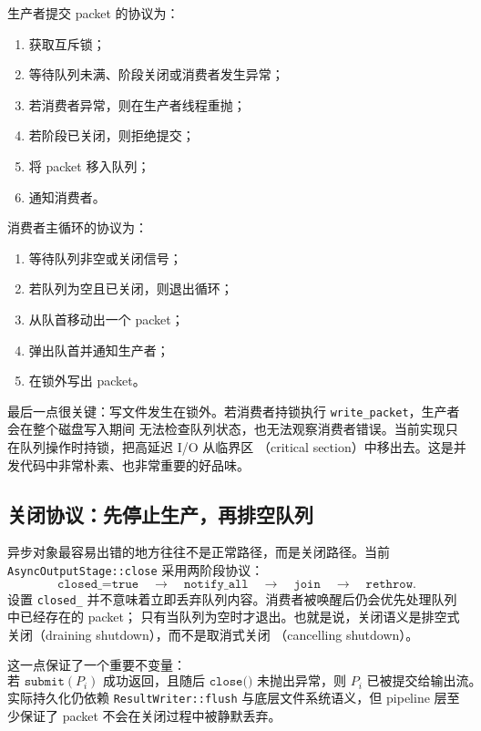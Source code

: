 生产者提交 packet 的协议为：

\begin{enumerate}
    \item 获取互斥锁；
    \item 等待队列未满、阶段关闭或消费者发生异常；
    \item 若消费者异常，则在生产者线程重抛；
    \item 若阶段已关闭，则拒绝提交；
    \item 将 packet 移入队列；
    \item 通知消费者。
\end{enumerate}

消费者主循环的协议为：

\begin{enumerate}
    \item 等待队列非空或关闭信号；
    \item 若队列为空且已关闭，则退出循环；
    \item 从队首移动出一个 packet；
    \item 弹出队首并通知生产者；
    \item 在锁外写出 packet。
\end{enumerate}

最后一点很关键：写文件发生在锁外。若消费者持锁执行 \texttt{write\_packet}，生产者会在整个磁盘写入期间
无法检查队列状态，也无法观察消费者错误。当前实现只在队列操作时持锁，把高延迟 I/O 从临界区
（critical section）中移出去。这是并发代码中非常朴素、也非常重要的好品味。

\subsection{关闭协议：先停止生产，再排空队列}

异步对象最容易出错的地方往往不是正常路径，而是关闭路径。当前 \texttt{AsyncOutputStage::close}
采用两阶段协议：
\[
    \texttt{closed\_=true}
    \quad\rightarrow\quad
    \texttt{notify\_all}
    \quad\rightarrow\quad
    \texttt{join}
    \quad\rightarrow\quad
    \texttt{rethrow}.
\]
设置 \texttt{closed\_} 并不意味着立即丢弃队列内容。消费者被唤醒后仍会优先处理队列中已经存在的 packet；
只有当队列为空时才退出。也就是说，关闭语义是排空式关闭（draining shutdown），而不是取消式关闭
（cancelling shutdown）。

这一点保证了一个重要不变量：
\[
    \text{若 } \texttt{submit}(P_i) \text{ 成功返回，且随后 } \texttt{close()} \text{ 未抛出异常，}
    \text{则 } P_i \text{ 已被提交给输出流。}
\]
实际持久化仍依赖 \texttt{ResultWriter::flush} 与底层文件系统语义，但 pipeline 层至少保证了
packet 不会在关闭过程中被静默丢弃。

